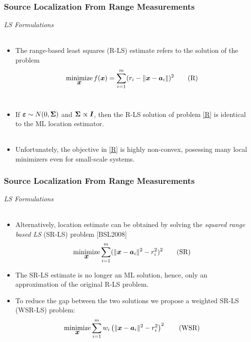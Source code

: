 \documentclass [t] {beamer} %
\begin{document}
\begin{frame} %
\frametitle{Source Localization From Range Measurements}
{\large \textit{LS Formulations}} \\~\\
\normalsize
\begin{itemize}
\item 
The range-based least squares (R-LS) estimate refers to the solution of the problem
\begin{equation} \label{R} 
\mathop{\mbox{minimize}}_{\mbox{\boldmath$x$}} f(\mbox{\boldmath$x$})=\sum_{i=1}^{m} (r_i - \|{\mbox{\boldmath$x$}} - {\mbox{\boldmath$a$}}_i\|)^2	\tag{R}
\end{equation} \\
\item If $\mbox{\boldmath${\varepsilon}$} \sim N(0,\mbox{\boldmath${\Sigma}$}) $ and $\mbox{\boldmath${\Sigma}$} \propto \mbox{\boldmath$I$}$, then the R-LS solution of problem \eqref{R} is identical to the ML location estimator. \\ ~\\
 \item  Unfortunately, the objective in \eqref{R} is highly non-convex, posessing many local minimizers even for small-scale systems.
\end{itemize}
\end{frame}



\begin{frame}
\frametitle{Source Localization From Range Measurements}
{\large \textit{LS Formulations}} \\~\\
\normalsize
\begin{itemize}
\item 
Alternatively, location estimate can be obtained by solving the \textit{squared range based LS} (SR-LS) problem [BSL2008]
\begin{equation} \label{SR}
\mathop{\mbox{minimize}}_{\mbox{\boldmath$x$}} \sum_{i=1}^{m} (\|{\mbox{\boldmath$x$}} - {\mbox{\boldmath$a$}}_i\|^2 - r_i^2)^2 \tag{SR}
\end{equation}

\item  
The SR-LS estimate is no longer an ML solution, hence, only an approximation of the original R-LS problem.\\
\item 
To reduce the gap between the two solutions we propose a weighted SR-LS (WSR-LS) problem:
\begin{equation} \label{WSR}
\mathop{\mbox{minimize}}_{\mbox{\boldmath$x$}} \sum_{i=1}^{m} w_i\left(\|{\mbox{\boldmath$x$}} - {\mbox{\boldmath$a$}}_i\|^2 - r_i^2\right)^2 \tag{WSR}
\end{equation}
\end{itemize}
\end{frame}
\end{document}
